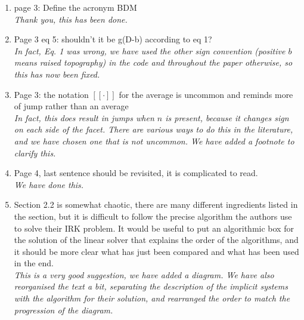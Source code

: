 \documentclass[a4paper,12pt]{article}
\begin{document}
\begin{enumerate}
\item page 3: Define the acronym BDM \\
  \emph{Thank you, this has been done.}

\item Page 3 eq 5: shouldn't it be g(D-b) according to eq
  1?\\ \emph{In fact, Eq. 1 was wrong, we have used the other sign
  convention (positive $b$ means raised topography) in the code and
  throughout the paper otherwise, so this has now been fixed.}
\item Page 3: the notation $[[ \cdot ]]$ for the average is uncommon
  and reminds more of jump rather than an average\\
  \emph{In fact, this
  does result in jumps when $n$ is present, because it changes sign on
  each side of the facet. There are various ways to do this in the literature,
  and we have chosen one that is not uncommon.
  We have added a footnote to clarify this.}
  
\item Page 4, last sentence should be revisited, it is complicated to read.\\
\emph{We have done this.}
  
\item Section 2.2 is somewhat chaotic, there are many different
  ingredients listed in the section, but it is difficult to follow the
  precise algorithm the authors use to solve their IRK problem. It
  would be useful to put an algorithmic box for the solution of the
  linear solver that explains the order of the algorithms, and it
  should be more clear what has just been compared and what has been
  used in the end.\\
  \emph{This is a very good suggestion, we have added a diagram. We have
  also reorganised the text a bit, separating the description of the
  implicit systems with the algorithm for their solution, and rearranged
  the order to match the progression of the diagram.}


\end{enumerate}
\end{document}
